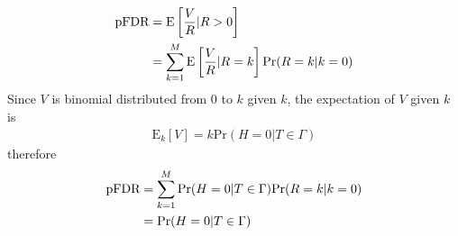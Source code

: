 \begin{exercise}[(Program)]
\end{exercise}

\begin{exercise}
  \begin{align}
    \mbox{pFDR} & = \mbox{E}\left[\frac{V}{R}|R>0\right] \notag \\
    & = \sum_{k=1}^M \mbox{E}\left[\frac{V}{R}|R=k\right]\mbox{Pr}(R=k|k=0)
  \end{align}
  Since $V$ is binomial distributed from $0$ to $k$ given $k$, the expectation
  of $V$ given $k$ is
  \begin{align}
    \mbox{E}_k[V] = k\mbox{Pr}(H=0|T\in \Gamma)
  \end{align}
  therefore
  \begin{align}
    \mbox{pFDR} & = \sum_{k=1}^M \mbox{Pr}(H=0|T\in \Gamma) \mbox{Pr}(R=k|k=0)
    \notag \\
    &= \mbox{Pr}(H=0|T\in \Gamma)
  \end{align}
\end{exercise}